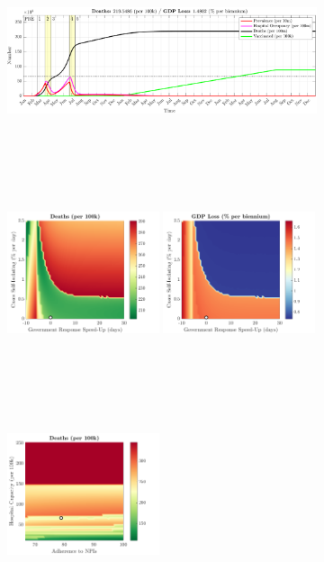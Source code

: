 \documentclass[paper=a4, fontsize=11pt]{scrartcl}
\numberwithin{figure}{section}
\numberwithin{table}{section}
\begin{document}
\begin{figure}[H]
\centering
    \begin{subfigure}[b]{\textwidth}
     	\includegraphics[width=\textwidth,height=5.5cm]{Counterfactuals/CN_spfl}
    \end{subfigure}
    \begin{subfigure}[b]{\textwidth}
      	\includegraphics[width=0.49\textwidth,height=6cm]{CN/SPANISH/ero_d}
	\hspace{0.05cm}
    	\includegraphics[width=0.49\textwidth,height=6cm]{CN/SPANISH/ero_g}
    \end{subfigure}
    \begin{subfigure}[b]{\textwidth}
      	\includegraphics[width=0.49\textwidth,height=6cm]{CN/SPANISH/npl_d}

\end{subfigure}
\end{figure}
\end{document}
